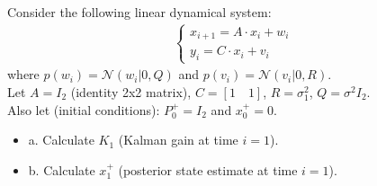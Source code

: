 \Exercise[number={8}]
Consider the following linear dynamical system:
\begin{align*}
    \begin{cases}
        x_{i+1}=A\cdot x_i + w_i \\ y_i=C\cdot x_i + v_i
    \end{cases}
\end{align*}
where \(p(w_i)=\mathcal{N}(w_i|0,Q)\) and \(p(v_i)=\mathcal{N}(v_i|0,R)\).\\
Let \(A=I_2\) (identity 2x2 matrix), \(C=[1\quad1]\), \(R=\sigma_1^2\),
\(Q=\sigma^2I_2\).\\
Also let (initial conditions): \(P_0^+=I_2\) and \(x_0^+=0\).
\begin{itemize}
    \item\quad a. Calculate \(K_1\) (Kalman gain at time \(i=1\)).
    \item\quad b. Calculate \(x_1^+\) (posterior state estimate at
    time \(i=1\)).
\end{itemize}

